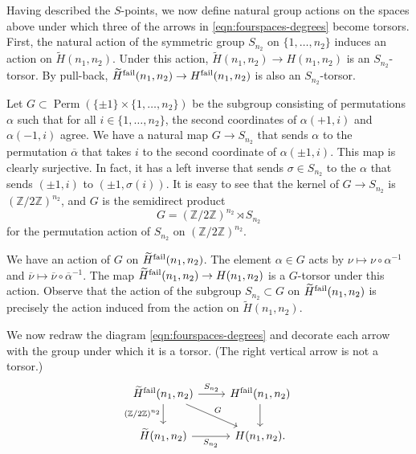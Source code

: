 \documentclass{amsart}
\numberwithin{equation}{section} \numberwithin{figure}{section}
\newcommand\ZZ{\mathbb{Z}}
\theoremstyle{one}
\theoremstyle{definition}
\begin{document}
Having described the \(S\)-points, we now define natural group actions on the spaces above under which three of the arrows in \eqref{eqn:fourspaces-degrees} become torsors.
First, the natural action of the symmetric group \(S_{n_2}\) on \(\{1,\dots,n_2\}\) induces an action on \(\widetilde H(n_1,n_2)\).
Under this action, \(\widetilde H(n_1,n_2) \to H(n_1,n_2)\) is an \(S_{n_2}\)-torsor.
By pull-back, \(\widetilde H^{\rm fail}(n_1,n_2) \to H^{\rm fail}(n_1,n_2)\) is also an \(S_{n_2}\)-torsor.

Let \(G \subset \operatorname{Perm}(\{\pm 1\} \times \{1,\dots,n_2\})\) be the subgroup consisting of permutations \(\alpha\) such that for all \(i\in\{1,\dots, n_2\}\), the second coordinates of \(\alpha(+1,i)\) and \(\alpha(-1,i)\) agree.
We have a natural map \(G \to S_{n_2}\) that sends \(\alpha\) to the permutation \(\overline \alpha\) that takes \(i\) to the second coordinate of \(\alpha(\pm 1,i)\).
This map is clearly surjective.
In fact, it has a left inverse that sends \(\sigma \in S_{n_2}\) to the \(\alpha\) that sends \((\pm 1,i)\) to \((\pm 1,\sigma(i))\).
It is easy to see that the kernel of \(G \to S_{n_2}\) is \((\ZZ/2\ZZ)^{n_2}\), and \(G\) is the semidirect product
\[ G = (\ZZ/2\ZZ)^{n_2} \rtimes S_{n_2}\]
for the permutation action of \(S_{n_2}\) on \((\ZZ/2\ZZ)^{n_2}\).  

We have an action of \(G\) on \(\widetilde H^{\rm fail}(n_1,n_2)\).
The element \(\alpha \in G\) acts by \(\nu \mapsto \nu \circ \alpha^{-1}\) and \(\overline \nu \mapsto \overline \nu \circ \overline \alpha^{-1}\).
The map \(\widetilde H^{\rm fail}(n_1,n_2) \to H(n_1,n_2)\) is a \(G\)-torsor under this action.
Observe that the action of the subgroup \(S_{n_2} \subset G\) on \(\widetilde H^{\rm fail}(n_1,n_2)\) is precisely the action induced from the action on \(\widetilde H(n_1,n_2)\).

We now redraw the diagram \eqref{eqn:fourspaces-degrees} and decorate  each arrow with
the group under which it is a torsor.
(The right vertical arrow is not a torsor.) 
\begin{equation}\label{eqn:fourspaces}
  \begin{tikzcd}
    \widetilde H^{\rm fail}(n_1,n_{2})\ar{d}[left]{(\ZZ/2\ZZ)^{n_2}}\ar{r}{S_{n_2}}\ar{rd}{G} & H^{\rm fail}(n_1,n_2)\ar{d} \\
    \widetilde H(n_1,n_2)\ar{r}[below]{S_{n_2}} & H(n_1,n_2).
  \end{tikzcd}
\end{equation}
\end{document}
